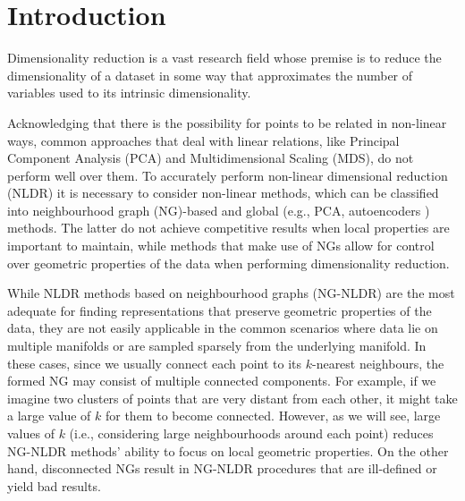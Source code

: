 \section{Introduction}


Dimensionality reduction is a vast research field whose premise is to reduce the dimensionality of a dataset in some way that approximates the number of variables used to its intrinsic dimensionality.

Acknowledging that there is the possibility for points to be related in non-linear ways, common approaches that deal with linear relations, like Principal Component Analysis (PCA) \cite{pca} and Multidimensional Scaling (MDS), do not perform well over them. To accurately perform non-linear dimensional reduction (NLDR) it is necessary to consider non-linear methods, which can be classified into neighbourhood graph (NG)-based and global (e.g., PCA, autoencoders \cite{autoencoder, autoencoder-book}) methods. The latter do not achieve competitive results when local properties are important to maintain, while methods that make use of NGs allow for control over geometric properties of the data when performing dimensionality reduction.



While NLDR methods based on neighbourhood graphs (NG-NLDR) are the most adequate for finding representations that preserve geometric properties of the data, they are not easily applicable in the common scenarios where data lie on multiple manifolds or are sampled sparsely from the underlying manifold. In these cases, since we usually connect each point to its $k$-nearest neighbours, the formed NG may consist of multiple connected components. For example, if we imagine two clusters of points that are very distant from each other, it might take a large value of $k$ for them to become connected. However, as we will see, large values of $k$ (i.e., considering large neighbourhoods around each point) reduces NG-NLDR methods' ability to focus on local geometric properties. On the other hand, disconnected NGs result in NG-NLDR procedures that are ill-defined or yield bad results.

